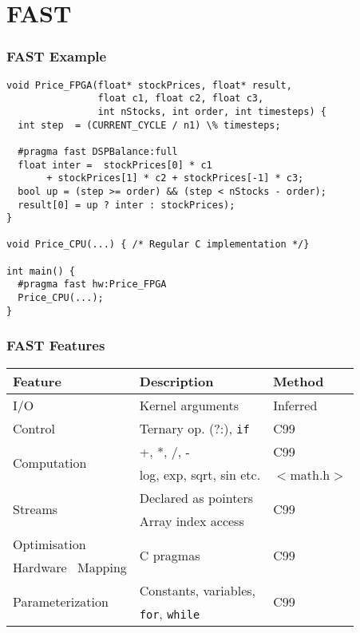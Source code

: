 \section{FAST}
\begin{frame}[fragile]
  \frametitle{FAST Example}

\begin{lstlisting}
void Price_FPGA(float* stockPrices, float* result,
                float c1, float c2, float c3,
                int nStocks, int order, int timesteps) {
  int step  = (CURRENT_CYCLE / n1) \% timesteps;

  #pragma fast DSPBalance:full
  float inter =  stockPrices[0] * c1
       + stockPrices[1] * c2 + stockPrices[-1] * c3;
  bool up = (step >= order) && (step < nStocks - order);
  result[0] = up ? inter : stockPrices);
}

void Price_CPU(...) { /* Regular C implementation */}

int main() {
  #pragma fast hw:Price_FPGA
  Price_CPU(...);
}
\end{lstlisting}

\end{frame}

\begin{frame}
  \frametitle{FAST Features}

\begin{table}[!h]
  \centering
\renewcommand{\arraystretch}{1.4}
\begin{tabular}{l|l|l}
\hline
\bf{Feature}                        & \bf{Description}              & \bf{Method}          \\
\hline\hline
  I/O                               & Kernel arguments              & Inferred             \\
\hline
  Control                           & Ternary op. (?:), \texttt{if} & C99                  \\
\hline
\multirow{2}{*}{Computation}        & +, *, /, -                    & C99                  \\
                                    & log, exp, sqrt, sin etc.      & $<$math.h$>$         \\
\hline
  \multirow{2}{*}{Streams}          & Declared as pointers          & \multirow{2}{*}{C99} \\
                                    & Array index access     &                      \\
\hline
  Optimisation                      & \multirow{2}{*}{C pragmas}    & \multirow{2}{*}{C99} \\
  Hardware \  Mapping               &                               &                      \\
\hline
  \multirow{2}{*}{Parameterization} & Constants, variables,         & \multirow{2}{*}{C99} \\
                                    & \texttt{for}, \texttt{while}  &                      \\
\end{tabular}
\end{table}
\end{frame}